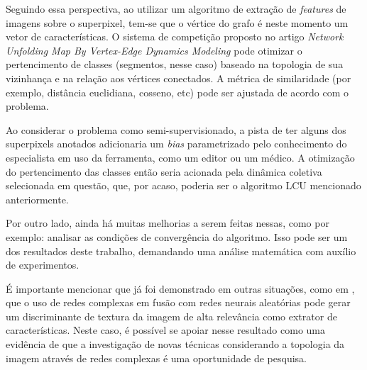 Seguindo essa perspectiva, ao utilizar um algoritmo de extração de
\textit{features} de imagens sobre o superpixel, tem-se que o vértice
do grafo é neste momento um vetor de características. O sistema de
competição proposto no artigo \textit{Network Unfolding Map By
Vertex-Edge Dynamics Modeling} pode otimizar o pertencimento de
classes (segmentos, nesse caso) baseado na topologia de sua vizinhança
e na relação aos vértices conectados. A métrica de similaridade
(por exemplo, distância euclidiana, cosseno, etc) pode ser
ajustada de acordo com o problema.

Ao considerar o problema como semi-supervisionado, a pista de ter
alguns dos superpixels anotados adicionaria um \textit{bias}
parametrizado pelo conhecimento do especialista em uso da ferramenta,
como um editor ou um médico. A otimização do pertencimento das classes
então seria acionada pela dinâmica coletiva selecionada em questão,
que, por acaso, poderia ser o algoritmo \gls{LCU} mencionado anteriormente.

Por outro lado, ainda há muitas melhorias a serem feitas nessas, como
por exemplo: analisar as condições de convergência do algoritmo. Isso
pode ser um dos resultados deste trabalho, demandando uma análise
matemática com auxílio de experimentos.

É importante mencionar que já foi demonstrado em outras situações,
como em \cite{JarbasComplexNetworks2020}, que o uso de redes complexas
em fusão com redes neurais aleatórias pode gerar um discriminante de
textura da imagem de alta relevância como extrator de
características. Neste caso, é possível se apoiar nesse resultado como
uma evidência de que a investigação de novas técnicas considerando a
topologia da imagem através de redes complexas é uma oportunidade de
pesquisa.

